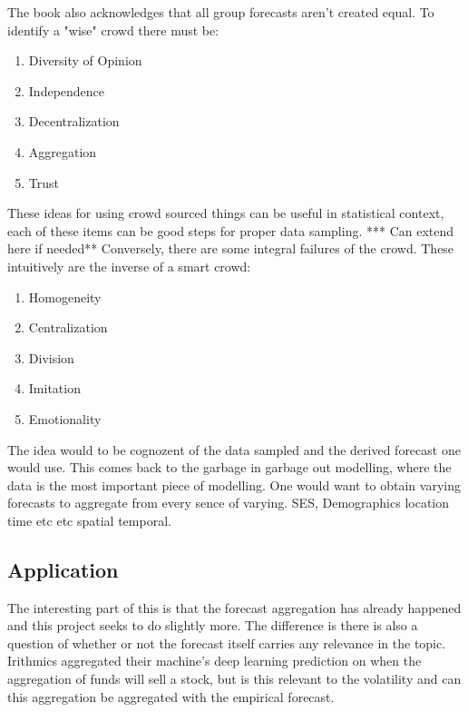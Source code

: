 The book also acknowledges that all group forecasts aren't created equal. To identify a "wise" crowd there must be: 
\begin{enumerate}
    \item Diversity of Opinion
    \item Independence
    \item Decentralization
    \item Aggregation 
    \item Trust
\end{enumerate}
\cite{wiki:crowds}
These ideas for using crowd sourced things can be useful in statistical context, each of these items can be good steps for proper data sampling. *** Can extend here if needed** Conversely, there are some integral failures of the crowd. These intuitively are the inverse of a smart crowd: 
\begin{enumerate}
    \item Homogeneity
    \item Centralization 
    \item Division
    \item Imitation
    \item Emotionality
\end{enumerate}
\cite{wiki:crowds} The idea would to be cognozent of the data sampled and the derived forecast one would use. This comes back to the garbage in garbage out modelling, where the data is the most important piece of modelling. One would want to obtain varying forecasts to aggregate from every sence of varying. SES, Demographics location time etc etc spatial temporal. 
\subsection{Application}
The interesting part of this is that the forecast aggregation has already happened and this project seeks to do slightly more. The difference is there is also a question of whether or not the forecast itself carries any relevance in the topic. Irithmics aggregated their machine's deep learning prediction on when the aggregation of funds will sell a stock, but is this relevant to the volatility and can this aggregation be aggregated with the empirical forecast. 

